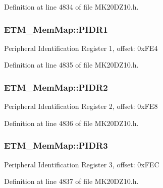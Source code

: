 Definition at line 4834 of file M\+K20\+D\+Z10.\+h.

\subsubsection[{\texorpdfstring{P\+I\+D\+R1}{PIDR1}}]{ E\+T\+M\+\_\+\+Mem\+Map\+::\+P\+I\+D\+R1}\hypertarget{struct_e_t_m___mem_map_a2b4d5fe9290dc96888a3c8361ff0b1cb}{}\label{struct_e_t_m___mem_map_a2b4d5fe9290dc96888a3c8361ff0b1cb}
Peripheral Identification Register 1, offset\+: 0x\+F\+E4 

Definition at line 4835 of file M\+K20\+D\+Z10.\+h.

\subsubsection[{\texorpdfstring{P\+I\+D\+R2}{PIDR2}}]{ E\+T\+M\+\_\+\+Mem\+Map\+::\+P\+I\+D\+R2}\hypertarget{struct_e_t_m___mem_map_a60875d0450fd0cc4953bf5551153dc24}{}\label{struct_e_t_m___mem_map_a60875d0450fd0cc4953bf5551153dc24}
Peripheral Identification Register 2, offset\+: 0x\+F\+E8 

Definition at line 4836 of file M\+K20\+D\+Z10.\+h.

\subsubsection[{\texorpdfstring{P\+I\+D\+R3}{PIDR3}}]{ E\+T\+M\+\_\+\+Mem\+Map\+::\+P\+I\+D\+R3}\hypertarget{struct_e_t_m___mem_map_a43bc7f48732725721d1af673497aeb3b}{}\label{struct_e_t_m___mem_map_a43bc7f48732725721d1af673497aeb3b}
Peripheral Identification Register 3, offset\+: 0x\+F\+EC 

Definition at line 4837 of file M\+K20\+D\+Z10.\+h.

